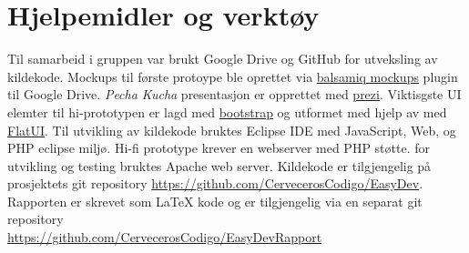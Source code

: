 \section{Hjelpemidler og verktøy} \label{sec:hjelpogverkt}
Til samarbeid i gruppen var brukt Google Drive og GitHub for utveksling av kildekode. Mockups til første protoype ble oprettet via \href{https://balsamiq.com/}{balsamiq mockups} plugin til Google Drive. \textit{Pecha Kucha} presentasjon er opprettet med \href{https://prezi.com/z_1ipfrf4m_3/skolelinux-pa-ny-mate/}{prezi}. Viktisgste UI elemter til hi-prototypen er lagd med \href{http://getbootstrap.com/}{bootstrap} og utformet med hjelp av med \href{http://designmodo.github.io/Flat-UI/}{FlatUI}. Til utvikling av kildekode bruktes Eclipse IDE med JavaScript, Web, og PHP eclipse miljø. Hi-fi prototype krever en webserver med PHP støtte. for utvikling og testing bruktes Apache web server. Kildekode er tilgjengelig på prosjektets git repository
\href{https://github.com/CervecerosCodigo/EasyDev}{https://github.com/CervecerosCodigo/EasyDev}.
Rapporten er skrevet som \LaTeX{} kode og er tilgjengelig via en separat git repository \\ \href{https://github.com/CervecerosCodigo/EasyDevRapport}{https://github.com/CervecerosCodigo/EasyDevRapport}

